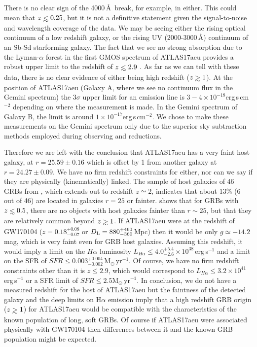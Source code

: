 \documentclass[twocolumn]{aastex61}
\def\lesssim{\mathrel{\hbox{\rlap{\hbox{\lower4pt\hbox{$\sim$}}}\hbox{$<$}}}}
\def\gtrsim{\mathrel{\hbox{\rlap{\hbox{\lower4pt\hbox{$\sim$}}}\hbox{$>$}}}}
\newcommand{\msun}{\mbox{M$_{\odot}$}}
\begin{document}
There is no clear sign of the 4000\,\AA\ break, for example, in either. This could mean that
$z\lesssim0.25$, but it is not a definitive statement given the signal-to-noise and wavelength coverage of the data. We may be seeing either the rising optical continuum of a low redshift galaxy, or the rising 
UV (2000-3000\,\AA) continuum of an Sb-Sd starforming
galaxy. 
The fact that we see no strong absorption due to the Lyman-$\alpha$ forest in the 
first GMOS spectrum of ATLAS17aeu provides a robust upper limit to the 
redshift of $z\lesssim2.9$ \citep[as done for other GRBs in][]{2009ApJS..185..526F}. As far as we can tell with these data, there is no clear evidence of either being high redshift ($z\gtrsim1$). 
At the position of ATLAS17aeu (Galaxy A, where we see no continuum flux in the Gemini spectrum) 
 the 3$\sigma$ upper limit for 
an emission line is $3 - 4 \times 10^{-18}$erg\,s\,cm$^{-2}$ depending 
on where the measurement is made. In the Gemini spectrum of Galaxy B, the limit is
around $1\times 10^{-17}$erg\,s\,cm$^{-2}$. 
We chose to make these measurements on the Gemini spectrum only due to the superior sky subtraction methods employed during observing and reductions. 

Therefore we are left with the conclusion that ATLAS17aeu has a 
very faint host galaxy, at $r=25.59\pm0.16$ which is offset by 1 
from another galaxy at $r=24.27\pm0.09$. We have no firm redshift constraints
for either, nor can we say if they are physically (kinematically) linked. 
 The sample of host galaxies of 46 GRBs from 
\cite{2009ApJ...691..182S}, which extends out to redshift $z\simeq2$, indicates that about
13\% (6 out of 46) are located in galaxies $r=25$ or fainter. 
\cite{2015A&A...581A.125K} 
shows that for GRBs with $z\lesssim0.5$, 
there are no objects with host galaxies fainter than 
$r\sim25$, but that they are relatively common beyond 
$z\gtrsim1$.  
If ATLAS17aeu were at the redshift of GW170104 
($z = 0.18^{+0.08}_{-0.07}$ or 
$D_{\rm L} = 880^{+460}_{-360}$\,Mpc)
then it would be only $g\simeq -14.2$ mag, 
which is very faint even for GRB host galaxies. 
Assuming this redshift, it  would imply a limit on the 
$H\alpha$ luminosity 
$L_{H\alpha} \leq 4.0^{+5.4}_{-2.6} \times 10^{38}$\,erg\,s$^{-1}$
and a limit on the SFR of 
$SFR \leq 0.003^{+0.004}_{-0.002}$\,\msun\,yr$^{-1}$. 
Of course, we have no firm redshift constraints other than 
it is $z\leq2.9$, which would correspond to 
$L_{H\alpha} \leq 3.2\times 10^{41}$erg\,s$^{-1}$
or a SFR limit of 
$SFR \leq 2.5$\msun\,yr$^{-1}$. 
In conclusion, we do not have a measured redshift
for the host of ATLAS17aeu but the faintness of the 
detected galaxy and the deep limits on H$\alpha$ emission
imply that a high redshift GRB origin ($z\gtrsim1$) for 
ATLAS17aeu would be compatible with the characteristics 
of the known population of long, soft GRBs. 
Of course if ATLAS17aeu were associated physically 
with GW170104 then differences between it and the 
known GRB population might be expected.  
\end{document}
